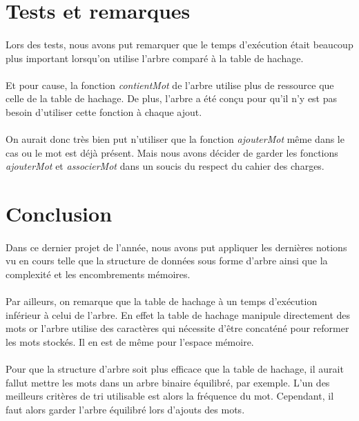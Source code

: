 \documentclass[12pt,a4paper,final]{article}
\begin{document}
\newpage

\section{Tests et remarques}

    \paragraph{}{Lors des tests, nous avons put remarquer que le temps d’exécution était beaucoup plus important lorsqu'on utilise l'arbre comparé à la table de hachage.}

    \paragraph{}{Et pour cause, la fonction \textit{contientMot} de l'arbre utilise plus de ressource que celle de la table de hachage. De plus, l'arbre a été conçu pour qu'il n'y est pas besoin d'utiliser cette fonction à chaque ajout.}

    \paragraph{}{On aurait donc très bien put n'utiliser que la fonction \textit{ajouterMot} même dans le cas ou le mot est déjà présent. Mais nous avons décider de garder les fonctions \textit{ajouterMot} et \textit{associerMot} dans un soucis du respect du cahier des charges.}
    
\newpage
  
\section*{Conclusion}

    \paragraph{}{Dans ce dernier projet de l'année, nous avons put appliquer les dernières notions vu en cours telle que la structure de données sous forme d'arbre ainsi que la complexité et les encombrements mémoires.}

    \paragraph{}{Par ailleurs, on remarque que la table de hachage à un temps d'exécution inférieur à celui de l'arbre. En effet la table de hachage manipule directement des mots or l'arbre utilise des caractères qui nécessite d'être concaténé pour reformer les mots stockés. Il en est de même pour l'espace mémoire.}
    
    \paragraph{}{Pour que la structure d'arbre soit plus efficace que la table de hachage, il aurait fallut mettre les mots dans un arbre binaire équilibré, par exemple. L'un des meilleurs critères de tri utilisable est alors la fréquence du mot. Cependant, il faut alors garder l'arbre équilibré lors d'ajouts des mots.}
\end{document}
